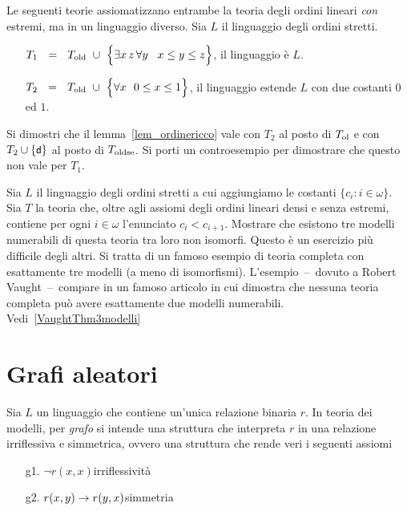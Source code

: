 \begin{exercise}
Le seguenti teorie assiomatizzano entrambe la teoria degli ordini lineari \textit{con\/} estremi, ma in un linguaggio diverso. Sia $L$ il linguaggio degli ordini stretti.
\begin{itemize}
\item[] $T_1\ \ =\ \ T_{\rm old}\ \cup\  \Big\{\exists x\,z\,\forall y\,\ \ x\le y\le z\Big\}$, il linguaggio \`e $L$.
\item[] $T_2\ \ =\ \ T_{\rm old}\ \cup\  \Big\{\forall x\ \ 0\le x\le 1\Big\}$, il linguaggio estende $L$ con due costanti $0$ ed $1$.
\end{itemize} 
Si dimostri che il lemma~\ref{lem_ordinericco} vale con $T_2$ al posto di $T_{\rm ol}$ e con $T_2\cup\{\textsf{\small d}\}$ al posto di $T_{\rm oldse}$. Si porti un controesempio per dimostrare che questo non vale per $T_1$.\QED 
\end{exercise}

\begin{exercise}\label{VaughtEsempio3modelli}
Sia $L$ il linguaggio degli ordini stretti a cui aggiungiamo le costanti $\{c_i: i\in\omega\}$. Sia $T$ la teoria che, oltre agli assiomi degli ordini lineari densi e senza estremi, contiene per ogni $i\in\omega$ l'enunciato $c_i<c_{i+1}$. Mostrare che esistono tre modelli numerabili di questa teoria tra loro non isomorfi. Questo \`e un esercizio pi\`u difficile degli altri. Si tratta di un famoso esempio di teoria completa con esattamente tre modelli (a meno di isomorfismi). L'esempio~--~dovuto a Robert Vaught~--~compare in un famoso articolo in cui dimostra che nessuna teoria completa pu\`o avere esattamente due modelli numerabili. Vedi~\ref{VaughtThm3modelli}\QED
\end{exercise}


\section{Grafi aleatori}
\label{grafoaleatorio}

Sia $L$ un linguaggio che contiene un'unica relazione binaria $r$. In teoria dei modelli, per \emph{grafo\/} si intende una struttura che interpreta $r$ in una relazione irriflessiva e simmetrica, ovvero una struttura che rende veri i seguenti assiomi

\begin{itemize}
\item[g1.] $\neg r(x,x)$\hfill irriflessivit\`a
\item[g2.] $r(x,y)\rightarrow r(y,x)$\hfill simmetria
\end{itemize}

